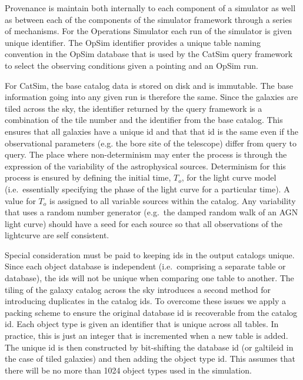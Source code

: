 \documentclass[11pt]{article}
\begin{document}
Provenance is maintain both internally to each component of a
simulator as well as between each of the components
of the simulator framework through a series of mechanisms. For the
Operations Simulator each run of the simulator is given unique
identifier.  The OpSim identifier provides a unique table naming
convention in the OpSim database that is used by the CatSim query
framework to select the observing conditions given a pointing and an
OpSim run. 

For CatSim, the base catalog data is stored on disk and is
immutable. The base information going into any given run is therefore
the same.  Since the galaxies are tiled across the sky, the identifier
returned by the query framework is a combination of the tile number
and the identifier from the base catalog. This ensures that all
galaxies have a unique id and that that id is the same even if the
observational parameters (e.g. the bore site of the telescope) differ
from query to query.  The place where non-determinism may enter the
process is through the expression of the variability of the
astrophysical sources. Determinism for this process is ensured by
defining the initial time, $T_o$, for the light curve model (i.e.\
essentially specifying the phase of the light curve for a particular
time). A value for $T_o$ is assigned to all variable sources within
the catalog.  Any variability that uses a random number
generator (e.g.\ the damped random walk of an AGN light curve) should have a
seed for each source so that all observations of the lightcurve are self consistent.

Special consideration must be paid to keeping ids in the output
catalogs unique.  Since each object database is independent (i.e.\
comprising a separate table or database), the ids will not be unique
when comparing one table to another. The tiling of the galaxy catalog
across the sky introduces a second method for introducing duplicates
in the catalog ids. To overcome these issues we apply a packing scheme
to ensure the original database id is recoverable from the catalog id.
Each object type is given an identifier that is unique across all
tables.  In practice, this is just an integer that is incremented when
a new table is added.  The unique id is then constructed by
bit-shifting the database id (or galtileid in the case of tiled
galaxies) and then adding the object type id.  This assumes that there will
be no more than 1024 object types used in the simulation.
\end{document}
